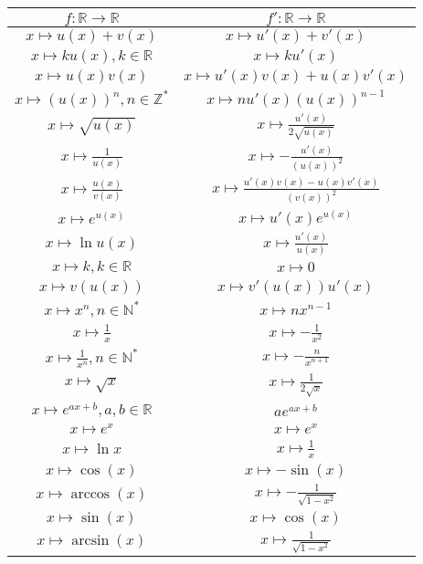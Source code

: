 \documentclass{article}
\theoremstyle{definition}
\theoremstyle{remark}
\theoremstyle{example}
\begin{document}
\begin{center} \small
\begin{tabular}{ |c|c| }
		\hline
		$f : \mathbb{R} \rightarrow \mathbb{R}$ & $f' : \mathbb{R} \rightarrow \mathbb{R}$\\
		\hline
		$x \mapsto u(x) + v(x)$ & $x \mapsto u'(x) + v'(x)$\\
		\hline
		$x \mapsto ku(x), k \in \mathbb{R}$ & $x \mapsto ku'(x)$\\
		\hline
		$x \mapsto u(x)v(x)$ & $x \mapsto u'(x)v(x) + u(x)v'(x)$\\
		\hline
		$x \mapsto (u(x))^n, n \in \mathbb{Z}^*$ & $x \mapsto nu'(x)(u(x))^{n-1}$\\
		\hline
		$x \mapsto \sqrt{u(x)}$ & $x \mapsto \frac{u'(x)}{2\sqrt{u(x)}}$\\
		\hline
		$x \mapsto \frac{1}{u(x)}$ & $x \mapsto -\frac{u'(x)}{(u(x))^2}$\\
		\hline
		$x \mapsto \frac{u(x)}{v(x)}$ & $x \mapsto \frac{u'(x)v(x) - u(x)v'(x)}{(v(x))^2}$\\
		\hline
		$x \mapsto e^{u(x)}$ & $x \mapsto u'(x)e^{u(x)}$\\
		\hline
		$x \mapsto \ln u(x)$ & $x \mapsto \frac{u'(x)}{u(x)}$\\
		\hline
		$x \mapsto k, k \in \mathbb{R}$ & $x \mapsto 0$\\
		\hline
		$x \mapsto v(u(x))$ & $x \mapsto v'(u(x)) u'(x)$\\
		\hline
		$x \mapsto x^n, n \in \mathbb{N}^*$ & $x \mapsto nx^{n-1}$\\
		\hline
		$x \mapsto \frac{1}{x}$ & $x \mapsto -\frac{1}{x^2}$\\
		\hline
		$x \mapsto \frac{1}{x^n}, n \in \mathbb{N}^*$ & $x \mapsto -\frac{n}{x^{n+1}}$\\
		\hline
		$x \mapsto \sqrt{x}$ & $x \mapsto \frac{1}{2\sqrt{x}}$\\
		\hline
		$x \mapsto e^{ax + b}, a, b \in \mathbb{R}$ & $ae^{ax + b}$\\
		\hline
		$x \mapsto e^x$ & $x \mapsto e^x$\\
		\hline
		$x \mapsto \ln x$ & $x \mapsto \frac{1}{x}$\\
		\hline
		$x \mapsto \cos(x)$ & $x \mapsto -\sin(x)$\\
		\hline
		$x \mapsto \arccos(x)$ & $x \mapsto -\frac{1}{\sqrt{1 - x^2}}$\\
		\hline
		$x \mapsto \sin(x)$ & $x \mapsto \cos(x)$\\
		\hline
		$x \mapsto \arcsin(x)$ & $x \mapsto \frac{1}{\sqrt{1 - x^2}}$\\

\end{tabular}
\end{center}
\end{document}
